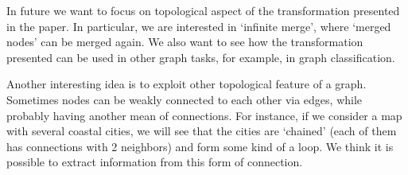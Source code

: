 In future we want to focus on topological aspect of the transformation presented in the paper.
In particular, we are interested in `infinite merge', where `merged nodes' can be merged again.
We also want to see how the transformation presented can be used in other graph tasks, for example, in graph classification.

Another interesting idea is to exploit other topological feature of a graph.
Sometimes nodes can be weakly connected to each other via edges, while probably having another mean of connections.
For instance, if we consider a map with several coastal cities, we will see that the cities are `chained' (each of them has connections with 2 neighbors) and form some kind of a loop.
We think it is possible to extract information from this form of connection.

